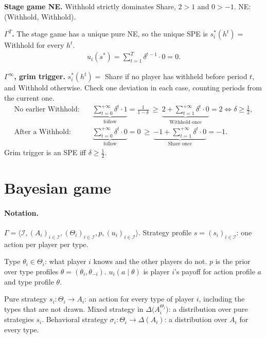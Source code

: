 \documentclass{article}
\begin{document}
\textbf{Stage game NE.} Withhold strictly dominates Share, $2>1$ and $0>-1$. NE: (Withhold, Withhold).

\textbf{$\Gamma^T$.} The stage game has a unique pure NE, so the unique SPE is $s_i^*(h^t)=$ Withhold for every $h^t$.
\begin{align*}
    u_i(s^*)=\sum_{t=1}^{T}\delta^{t-1}\cdot 0=0.
\end{align*}

\textbf{$\Gamma^\infty$, grim trigger.} $s_i^*(h^t)=$ Share if no player has withheld before period $t$, and Withhold otherwise.
Check one deviation in each case, counting periods from the current one.
\begin{align*}
    \text{No earlier Withhold}:&\quad \underbrace{\sum_{t=0}^{+\infty}\delta^t\cdot 1}_{\text{follow}}=\frac{1}{1-\delta}\ \ge\ \underbrace{2+\sum_{t=1}^{+\infty}\delta^t\cdot 0}_{\text{Withhold once}}=2\iff\delta\ge\tfrac12,\\
    \text{After a Withhold}:&\quad \underbrace{\sum_{t=0}^{+\infty}\delta^t\cdot 0}_{\text{follow}}=0\ \ge\ \underbrace{-1+\sum_{t=1}^{+\infty}\delta^t\cdot 0}_{\text{Share once}}=-1.
\end{align*}
Grim trigger is an SPE iff $\delta\ge\tfrac12$.

\section{Bayesian game}

\paragraph{Notation.}
$\Gamma=\langle\mathcal I,(A_i)_{i\in\mathcal I},(\Theta_i)_{i\in\mathcal I},p,(u_i)_{i\in\mathcal I}\rangle$.
Strategy profile $s=(s_i)_{i\in\mathcal I}$: one action per player per type.

Type $\theta_i\in\Theta_i$: what player $i$ knows and the other players do not.
$p$ is the prior over type profiles $\theta=(\theta_i,\theta_{-i})$.
$u_i(a\mid\theta)$ is player $i$'s payoff for action profile $a$ and type profile $\theta$.

Pure strategy $s_i:\Theta_i\to A_i$: an action for every type of player $i$, including the types that are not drawn.
Mixed strategy in $\Delta\big(A_i^{\Theta_i}\big)$: a distribution over pure strategies $s_i$.
Behavioral strategy $\sigma_i:\Theta_i\to\Delta(A_i)$: a distribution over $A_i$ for every type.
\end{document}
